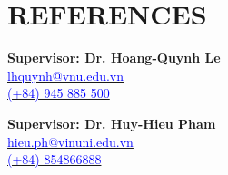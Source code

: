 \documentclass[11pt,a4paper]{article}
\begin{document}
\section{REFERENCES}
\noindent
\begin{minipage}[t]{0.48\linewidth}
\textbf{Supervisor: Dr. Hoang-Quynh Le}\\
\href{mailto:lhquynh@vnu.edu.vn}{\textcolor{blue}{\faEnvelope\hspace{0.25em}lhquynh@vnu.edu.vn}}\\
\href{tel:+84 945 885 500}{\textcolor{blue}{\faPhone\hspace{0.25em}(+84) 945 885 500}}
\end{minipage}\hfill
\begin{minipage}[t]{0.48\linewidth}
\textbf{Supervisor: Dr. Huy-Hieu Pham}\\
\href{mailto:hieu.ph@vinuni.edu.vn}{\textcolor{blue}{\faEnvelope\hspace{0.25em}hieu.ph@vinuni.edu.vn}}\\
\href{tel:+84854866888}{\textcolor{blue}{\faPhone\hspace{0.25em}(+84) 854866888}}
\end{minipage}

    
\end{document}

